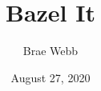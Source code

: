\documentclass[aspectratio=169]{beamer}
\title{Bazel It}
\author{Brae Webb}
\institute{University of Queensland}
\date{August 27, 2020}
\begin{document}
\begin{title-slide}
\titlepage
\end{title-slide}
\end{document}
